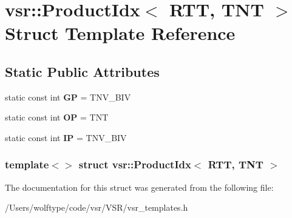 \hypertarget{structvsr_1_1_product_idx_3_01_r_t_t_00_01_t_n_t_01_4}{\section{vsr\-:\-:Product\-Idx$<$ R\-T\-T, T\-N\-T $>$ Struct Template Reference}
\label{structvsr_1_1_product_idx_3_01_r_t_t_00_01_t_n_t_01_4}
}
\subsection*{Static Public Attributes}
\begin{DoxyCompactItemize}
\item 
\hypertarget{structvsr_1_1_product_idx_3_01_r_t_t_00_01_t_n_t_01_4_aaec89439e83b8b764ee6ad808d134b42}{static const int {\bfseries G\-P} = T\-N\-V\-\_\-\-B\-I\-V}\label{structvsr_1_1_product_idx_3_01_r_t_t_00_01_t_n_t_01_4_aaec89439e83b8b764ee6ad808d134b42}

\item 
\hypertarget{structvsr_1_1_product_idx_3_01_r_t_t_00_01_t_n_t_01_4_a53308bb74f89f988c88a0b4b69f3ebf1}{static const int {\bfseries O\-P} = T\-N\-T}\label{structvsr_1_1_product_idx_3_01_r_t_t_00_01_t_n_t_01_4_a53308bb74f89f988c88a0b4b69f3ebf1}

\item 
\hypertarget{structvsr_1_1_product_idx_3_01_r_t_t_00_01_t_n_t_01_4_ac9d6f554757b8c4d78d61db4609f2bee}{static const int {\bfseries I\-P} = T\-N\-V\-\_\-\-B\-I\-V}\label{structvsr_1_1_product_idx_3_01_r_t_t_00_01_t_n_t_01_4_ac9d6f554757b8c4d78d61db4609f2bee}

\end{DoxyCompactItemize}
\subsubsection*{template$<$$>$ struct vsr\-::\-Product\-Idx$<$ R\-T\-T, T\-N\-T $>$}



The documentation for this struct was generated from the following file\-:\begin{DoxyCompactItemize}
\item 
/\-Users/wolftype/code/vsr/\-V\-S\-R/vsr\-\_\-templates.\-h\end{DoxyCompactItemize}
